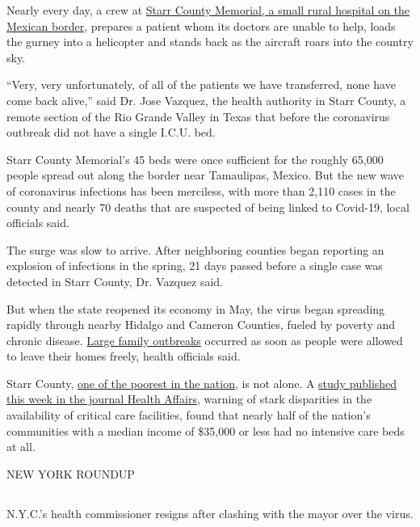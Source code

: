 Nearly every day, a crew at
\href{https://www.nytimes.com/2020/08/04/us/texas-coronavirus-rio-grande-valley-starr-county.html}{Starr
County Memorial, a small rural hospital on the Mexican border}, prepares
a patient whom its doctors are unable to help, loads the gurney into a
helicopter and stands back as the aircraft roars into the country sky.

``Very, very unfortunately, of all of the patients we have transferred,
none have come back alive,'' said Dr. Jose Vazquez, the health authority
in Starr County, a remote section of the Rio Grande Valley in Texas that
before the coronavirus outbreak did not have a single I.C.U. bed.

Starr County Memorial's 45 beds were once sufficient for the roughly
65,000 people spread out along the border near Tamaulipas, Mexico. But
the new wave of coronavirus infections has been merciless, with more
than 2,110 cases in the county and nearly 70 deaths that are suspected
of being linked to Covid-19, local officials said.

The surge was slow to arrive. After neighboring counties began reporting
an explosion of infections in the spring, 21 days passed before a single
case was detected in Starr County, Dr. Vazquez said.

But when the state reopened its economy in May, the virus began
spreading rapidly through nearby Hidalgo and Cameron Counties, fueled by
poverty and chronic disease.
\href{https://www.nytimes.com/2020/07/14/us/coronavirus-texas-rio-grande-valley-border.html}{Large
family outbreaks} occurred as soon as people were allowed to leave their
homes freely, health officials said.

Starr County,
\href{https://www.usatoday.com/story/money/2019/01/25/poorest-counties-in-the-us-median-household-income/38870175/}{one
of the poorest in the nation}, is not alone. A
\href{https://www.healthaffairs.org/doi/10.1377/hlthaff.2020.00581}{study
published this week in the journal Health Affairs}, warning of stark
disparities in the availability of critical care facilities, found that
nearly half of the nation's communities with a median income of \$35,000
or less had no intensive care beds at all.

NEW YORK ROUNDUP

\hypertarget{-6}{%
\subsection{}\label{-6}}

N.Y.C.'s health commissioner resigns after clashing with the mayor over
the virus.

